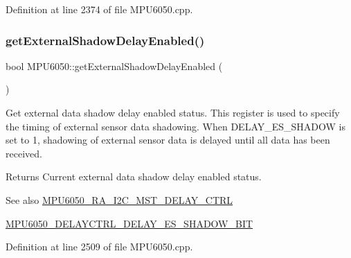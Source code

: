 Definition at line 2374 of file M\+P\+U6050.\+cpp.


\begin{DoxyCode}{0}

\end{DoxyCode}
\mbox{\label{classMPU6050_a0e5cb13838298609b5260fd1558f8c92}} 
\subsubsection{\texorpdfstring{getExternalShadowDelayEnabled()}{getExternalShadowDelayEnabled()}}
{\footnotesize\ttfamily bool M\+P\+U6050\+::get\+External\+Shadow\+Delay\+Enabled (\begin{DoxyParamCaption}{ }\end{DoxyParamCaption})}

Get external data shadow delay enabled status. This register is used to specify the timing of external sensor data shadowing. When D\+E\+L\+A\+Y\+\_\+\+E\+S\+\_\+\+S\+H\+A\+D\+OW is set to 1, shadowing of external sensor data is delayed until all data has been received. \begin{DoxyReturn}{Returns}
Current external data shadow delay enabled status. 
\end{DoxyReturn}
\begin{DoxySeeAlso}{See also}
\mbox{\hyperlink{MPU6050_8h_a95960b2c82d00341b6174272e2fb3e07}{M\+P\+U6050\+\_\+\+R\+A\+\_\+\+I2\+C\+\_\+\+M\+S\+T\+\_\+\+D\+E\+L\+A\+Y\+\_\+\+C\+T\+RL}} 

\mbox{\hyperlink{MPU6050_8h_a77b25de3f3dbdb1aec3201cab7d88980}{M\+P\+U6050\+\_\+\+D\+E\+L\+A\+Y\+C\+T\+R\+L\+\_\+\+D\+E\+L\+A\+Y\+\_\+\+E\+S\+\_\+\+S\+H\+A\+D\+O\+W\+\_\+\+B\+IT}} 
\end{DoxySeeAlso}


Definition at line 2509 of file M\+P\+U6050.\+cpp.



